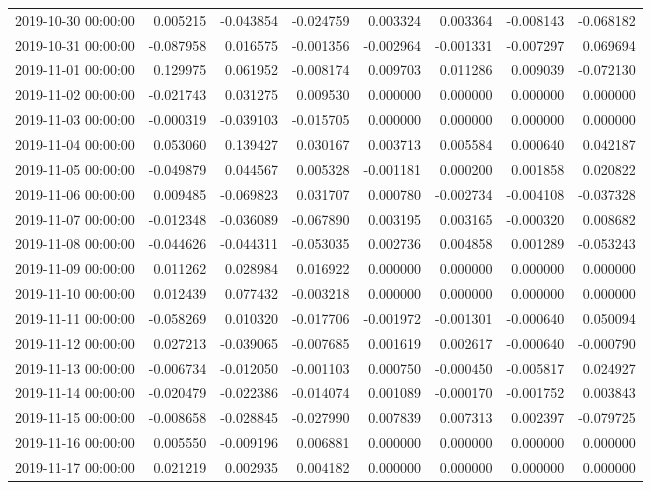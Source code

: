 \begin{tabular}{lrrrrrrr}
2019-10-30 00:00:00 & 0.005215 & -0.043854 & -0.024759 & 0.003324 & 0.003364 & -0.008143 & -0.068182 \\
2019-10-31 00:00:00 & -0.087958 & 0.016575 & -0.001356 & -0.002964 & -0.001331 & -0.007297 & 0.069694 \\
2019-11-01 00:00:00 & 0.129975 & 0.061952 & -0.008174 & 0.009703 & 0.011286 & 0.009039 & -0.072130 \\
2019-11-02 00:00:00 & -0.021743 & 0.031275 & 0.009530 & 0.000000 & 0.000000 & 0.000000 & 0.000000 \\
2019-11-03 00:00:00 & -0.000319 & -0.039103 & -0.015705 & 0.000000 & 0.000000 & 0.000000 & 0.000000 \\
2019-11-04 00:00:00 & 0.053060 & 0.139427 & 0.030167 & 0.003713 & 0.005584 & 0.000640 & 0.042187 \\
2019-11-05 00:00:00 & -0.049879 & 0.044567 & 0.005328 & -0.001181 & 0.000200 & 0.001858 & 0.020822 \\
2019-11-06 00:00:00 & 0.009485 & -0.069823 & 0.031707 & 0.000780 & -0.002734 & -0.004108 & -0.037328 \\
2019-11-07 00:00:00 & -0.012348 & -0.036089 & -0.067890 & 0.003195 & 0.003165 & -0.000320 & 0.008682 \\
2019-11-08 00:00:00 & -0.044626 & -0.044311 & -0.053035 & 0.002736 & 0.004858 & 0.001289 & -0.053243 \\
2019-11-09 00:00:00 & 0.011262 & 0.028984 & 0.016922 & 0.000000 & 0.000000 & 0.000000 & 0.000000 \\
2019-11-10 00:00:00 & 0.012439 & 0.077432 & -0.003218 & 0.000000 & 0.000000 & 0.000000 & 0.000000 \\
2019-11-11 00:00:00 & -0.058269 & 0.010320 & -0.017706 & -0.001972 & -0.001301 & -0.000640 & 0.050094 \\
2019-11-12 00:00:00 & 0.027213 & -0.039065 & -0.007685 & 0.001619 & 0.002617 & -0.000640 & -0.000790 \\
2019-11-13 00:00:00 & -0.006734 & -0.012050 & -0.001103 & 0.000750 & -0.000450 & -0.005817 & 0.024927 \\
2019-11-14 00:00:00 & -0.020479 & -0.022386 & -0.014074 & 0.001089 & -0.000170 & -0.001752 & 0.003843 \\
2019-11-15 00:00:00 & -0.008658 & -0.028845 & -0.027990 & 0.007839 & 0.007313 & 0.002397 & -0.079725 \\
2019-11-16 00:00:00 & 0.005550 & -0.009196 & 0.006881 & 0.000000 & 0.000000 & 0.000000 & 0.000000 \\
2019-11-17 00:00:00 & 0.021219 & 0.002935 & 0.004182 & 0.000000 & 0.000000 & 0.000000 & 0.000000 \\

\end{tabular}

